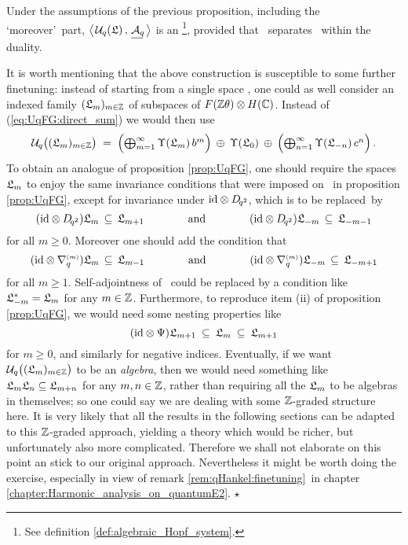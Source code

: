 \begin{cor}  \label{cor:UqFGAq:Hopf_system}
  Under the assumptions of the previous proposition, including the \lq moreover\rq\ part,
  $\left\langle\vertM\right. \! \UqT, \, \underline{\Aq\!} \left.\vertM\right\rangle$
  is an \ahss\footnote{See definition \ref{def:algebraic_Hopf_system}.},
  provided that\/ \UqT\ separates\/ \Aq\ within the duality.
\end{cor}


{\small
\begin{remark} \label{rem:calculus:finetuning}  \rm
It is worth mentioning that the above construction is susceptible
to some further finetuning: instead of starting from a single space \calL,
one could as well consider an indexed family $(\calL_m)_{m\in\ZZ}$
of subspaces of $\FZ \tens \HC$.
Instead of (\ref{eq:UqFG:direct_sum}) we would then use
$$ \Uq\!\left(\vertM(\calL_m)_{m\in\ZZ}\right) \;=\;
   \textstyle \left( \bigoplus_{m=1}^\infty  \Upsilon(\calL_m)\,b^m  \vertL\right)
                  \: \oplus \:    \Upsilon(\calL_0)   \: \oplus \:
       \left( \bigoplus_{n=1}^\infty  \Upsilon(\calL_{-n})\,c^n  \vertL\right). $$
To obtain an analogue of proposition \ref{prop:UqFG}, one should
require the spaces $\calL_m$ to enjoy the same invariance
conditions that were imposed on \calL\ in proposition \ref{prop:UqFG},
except for invariance under $\id \tens \Dqsqr$, which is to be \mbox{replaced by}
$$  (\id \tens \Dqsqr) \calL_m \,\subseteq\,\calL_{m+1}
      \andspace{4em}
    (\id \tens \Dqsqr) \calL_{-m} \,\subseteq\, \calL_{-m-1}   $$
for all $m \geq 0$.
Moreover one should add the condition that
$$  (\id \tens \nabq{m}) \calL_m  \,\subseteq\, \calL_{m-1}
      \andspace{4em}
    (\id \tens \nabq{m}) \calL_{-m} \,\subseteq\, \calL_{-m+1} $$
for all $m \geq 1$.
Self-adjointness of \calL\ could be replaced by a
condition like $\calL_{-m}^* = \calL_m$ for any $m \in \ZZ$.
Furthermore, to reproduce item (ii) of proposition \ref{prop:UqFG},
we would need some nesting properties like
$$ (\id \tens \Psi) \calL_{m+1} \: \subseteq\: \calL_m  \:\subseteq \: \calL_{m+1} $$
for $m \geq 0$, and similarly for negative indices.
Eventually, if we want $\Uq\!\left(\vertM(\calL_m)_{m\in\ZZ}\right)$
to be an {\em algebra\/}, then we would need something like
$\calL_m \calL_n \subseteq \calL_{m+n}$
for any $m,n\in \ZZ$, rather than requiring all the $\calL_m$ to
be algebras in themselves; so one could say we are dealing with some
$\ZZ$-graded structure here.
It is very likely that all the results in the following sections can be adapted to this
$\ZZ$-graded approach, yielding a theory which would be richer, but unfortunately
also more complicated.
Therefore we shall not elaborate on this point an stick to our original approach.
Nevertheless it might be worth doing the exercise, especially in view of
remark \ref{rem:qHankel:finetuning}\ in chapter \ref{chapter:Harmonic_analysis_on_quantumE2}\@.
\hfill $\star$
\end{remark}
}
